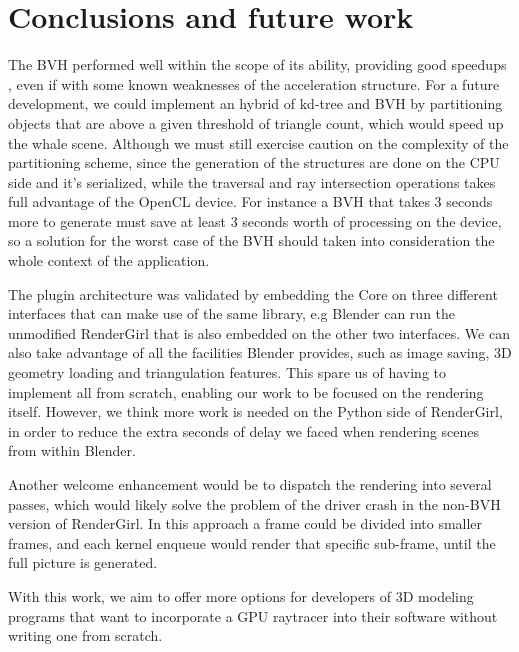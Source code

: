 \documentclass{vgtc}
\begin{document}
\section{Conclusions and future work}
\label{sec:conclusion}

The BVH performed well within the scope of its ability, providing good
speedups , even if with some known weaknesses of the acceleration
structure. For a future development, we could implement an hybrid of
kd-tree and BVH by partitioning objects that are above a given
threshold of triangle count, which would speed up the whale
scene. Although we must still exercise caution on the complexity of
the partitioning scheme, since the generation of the structures are done
on the CPU side and it's serialized, while the traversal and ray
intersection operations takes full advantage of the OpenCL device. For
instance a BVH that takes 3 seconds more to generate must save at
least 3 seconds worth of processing on the device, so a solution for
the worst case of the BVH should taken into consideration the whole
context of the application.

The plugin architecture was validated by embedding the Core on three
different interfaces that can make use of the same library, e.g
Blender can run the unmodified RenderGirl that is also embedded on the
other two interfaces. We can also take advantage of all the facilities
Blender provides, such as image saving, 3D geometry loading and
triangulation features. This spare us of having to implement all from
scratch, enabling our work to be focused on the rendering
itself. However, we think more work is needed on the Python side of
RenderGirl, in order to reduce the extra seconds of delay we faced
when rendering scenes from within Blender.

Another welcome enhancement would be to dispatch the rendering into
several passes, which would likely solve the problem of the driver
crash in the non-BVH version of RenderGirl. In this approach a frame
could be divided into smaller frames, and each kernel enqueue would
render that specific sub-frame, until the full picture is generated.

With this work, we aim to offer more options for developers of 3D
modeling programs that want to incorporate a GPU raytracer into their
software without writing one from scratch.






\end{document}
